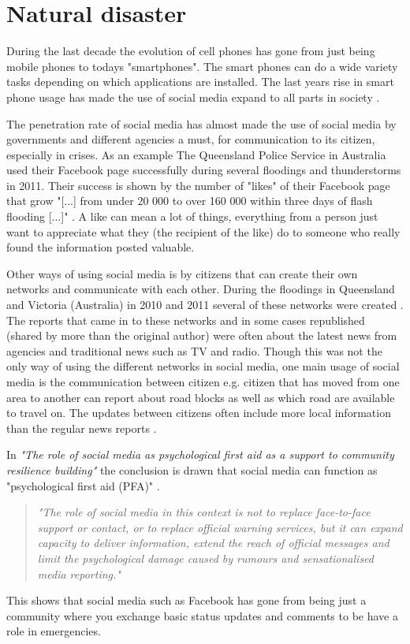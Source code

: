 \section{Natural disaster}
During the last decade the evolution of cell phones has gone from just being mobile phones to todays "smartphones".
The smart phones can do a wide variety tasks depending on which applications are installed.
The last years rise in smart phone usage has made the use of social media expand to all parts in society \cite{taylor2012}.

The penetration rate of social media has almost made the use of social media by governments and different agencies a must, for communication to its citizen, especially in crises.
As an example The Queensland Police Service in Australia used their Facebook page successfully during several floodings and thunderstorms in 2011.
Their success is shown by the number of "likes" of their Facebook page that grow "[...] from under 20 000 to over 160 000 within three days of flash flooding [...]" \cite{taylor2012}.
A like can mean a lot of things, everything from a person just want to appreciate what they (the recipient of the like) do to someone who really found the information posted valuable.

Other ways of using social media is by citizens that can create their own networks and communicate with each other.
During the floodings in Queensland and Victoria (Australia) in 2010 and 2011 several of these networks were created \cite{bird2012}.
The reports that came in to these networks and in some cases republished (shared by more than the original author) were often about the latest news from agencies and traditional news such as TV and radio.
Though this was not the only way of using the different networks in social media, one main usage of social media is the communication between citizen e.g. citizen that has moved from one area to another can report about road blocks as well as which road are available to travel on.
The updates between citizens often include more local information than the regular news reports \cite{bird2012}.

In \textit{"The role of social media as psychological first aid as a support to community resilience building"} \cite{taylor2012} the conclusion is drawn that social media can function as "psychological first aid (PFA)" \cite{taylor2012}. 
\begin{quote}
\textit{"The role of social media in
this context is not to replace face-to-face support or contact, or to replace official warning services, but it can expand capacity to deliver information, extend the reach of official messages and limit the psychological damage caused by rumours and sensationalised media reporting."} \cite{taylor2012}
\end{quote}
This shows that social media such as Facebook has gone from being just a community where you exchange basic status updates and comments to be have a role in emergencies.

